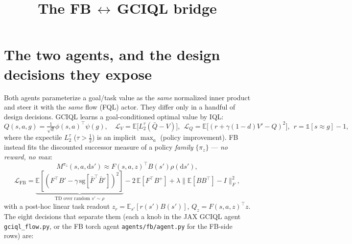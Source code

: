 \documentclass[11pt]{article}
\title{\bf The FB\,$\leftrightarrow$\,GCIQL bridge}
\begin{document}
\maketitle
\vspace{-1.5em}

\section{The two agents, and the design decisions they expose}
\label{sec:decisions}
Both agents parameterize a goal/task value as the \emph{same} normalized inner
product and steer it with the \emph{same} flow (FQL) actor. They differ only in a
handful of design decisions. GCIQL learns a goal-conditioned optimal value by IQL:
\[
Q(s,a,g)=\tfrac{1}{\sqrt d}\phi(s,a)^\top\psi(g),\quad
\mathcal L_V=\mathbb E\big[L_2^\tau(\bar Q{-}V)\big],\ \
\mathcal L_Q=\mathbb E\big[(r{+}\gamma(1{-}d)V'{-}Q)^2\big],\ \
r=\mathbb 1[s{\approx}g]{-}1,
\]
where the expectile $L_2^\tau$ ($\tau{>}\tfrac12$) is an implicit $\max_a$
(policy improvement). FB instead fits the discounted successor measure of a policy
\emph{family} $\{\pi_z\}$ --- \emph{no reward, no max}:
\[
M^{\pi_z}(s,a,\mathrm ds')\approx F(s,a,z)^\top B(s')\rho(\mathrm ds'),
\]
\[
\mathcal L_{\mathrm{FB}}=\underbrace{\mathbb E[(F^\top B'{-}\gamma\,\mathrm{sg}[\bar F^\top\bar B'])^2]}_{\text{TD over random }s'\sim\rho}
-2\,\mathbb E[F^\top B^{+}]+\lambda\|\mathbb E[BB^\top]{-}I\|_F^2,
\]
with a post-hoc linear task readout $z_r=\mathbb E_{s'}[r(s')B(s')]$,
$Q_z=F(s,a,z)^\top z$. The eight decisions that separate them (each a knob in the
JAX GCIQL agent \texttt{gciql\_flow.py}, or the FB torch agent
\texttt{agents/fb/agent.py} for the FB-side rows) are:
\end{document}
